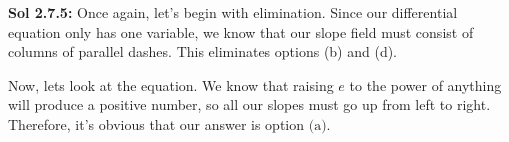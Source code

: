 \begin{tcolorbox}[example]
\begin{oneparchoices}
    \end{oneparchoices}
\end{tcolorbox}
\begin{tcolorbox}[solution]
    \textbf{Sol 2.7.5:} Once again, let's begin with elimination. Since our differential equation only has one variable, we know that our slope field must consist of columns of parallel dashes. This eliminates options (b) and (d). \par
    \vspace{11pt}
    Now, lets look at the equation. We know that raising $e$ to the power of anything will produce a positive number, so all our slopes must go up from left to right. Therefore, it's obvious that our answer is option $\boxed{\text{(a)}}$.
\end{tcolorbox} \vspace{11pt}

